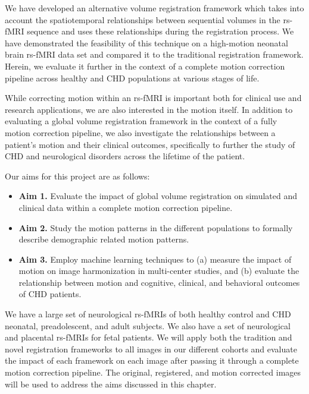 We have developed an alternative volume registration framework which takes into account the spatiotemporal relationships between sequential volumes in the rs-fMRI sequence and uses these relationships during the registration process. We have demonstrated the feasibility of this technique on a high-motion neonatal brain rs-fMRI data set and compared it to the traditional registration framework. Herein, we evaluate it further in the context of a complete motion correction pipeline across healthy and CHD populations at various stages of life. 

While correcting motion within an rs-fMRI is important both for clinical use and research applications, we are also interested in the motion itself. In addition to evaluating a global volume registration framework in the context of a fully motion correction pipeline, we also investigate the relationships between a patient's motion and their clinical outcomes, specifically to further the study of CHD and neurological disorders across the lifetime of the patient. %


Our aims for this project are as follows:
\begin{itemize}
\item \textbf{Aim 1.} Evaluate the impact of global volume registration on simulated and clinical data within a complete motion correction pipeline.
\item \textbf{Aim 2.} Study the motion patterns in the different populations to formally describe demographic related motion patterns.
\item \textbf{Aim 3.} Employ machine learning techniques to (a) measure the impact of motion on image harmonization in multi-center studies, and (b) evaluate the relationship between motion and cognitive, clinical, and behavioral outcomes of CHD patients.
\end{itemize}


We have a large set of neurological rs-fMRIs of both healthy control and CHD neonatal, preadolescent, and adult subjects. We also have a set of neurological and placental rs-fMRIs for fetal patients. We will apply both the tradition and novel registration frameworks to all images in our different cohorts and evaluate the impact of each framework on each image after passing it through a complete motion correction pipeline. The original, registered, and motion corrected images will be used to address the aims discussed in this chapter.


